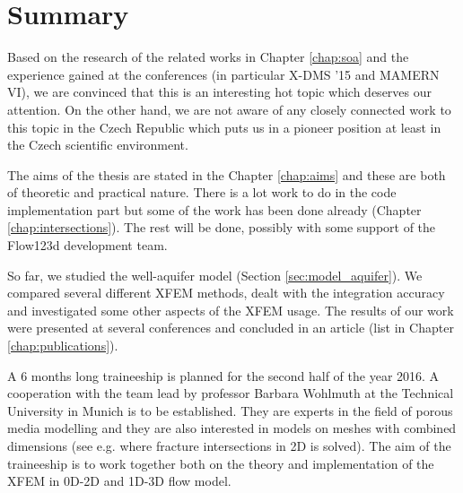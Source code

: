 \documentclass[bibliography=totocnumbered,dvipsnames,FM,Dis]{tulthesis}
\begin{document}

\chapter{Summary} \label{chap:summary}

Based on the research of the related works in Chapter \ref{chap:soa} and the experience gained at the conferences
(in particular X-DMS '15 and MAMERN VI), we are convinced that this is an interesting hot topic which deserves
our attention. On the other hand, we are not aware of any closely connected work to this topic in the Czech Republic
which puts us in a pioneer position at least in the Czech scientific environment.

The aims of the thesis are stated in the Chapter \ref{chap:aims} and these are both of theoretic and practical nature.
There is a lot work to do in the code implementation part but some of the work has been done already 
(Chapter \ref{chap:intersections}). The rest will be done, possibly with some support of the Flow123d development team. 

So far, we studied the well-aquifer model (Section \ref{sec:model_aquifer}). We compared several different XFEM methods, 
dealt with the integration accuracy and investigated some other aspects of the XFEM usage. The results
of our work were presented at several conferences and concluded in an article (list in Chapter \ref{chap:publications}).

A 6 months long traineeship is planned for the second half of the year 2016. A cooperation with the team lead
by professor Barbara Wohlmuth at the Technical University in Munich is to be established. They are experts
in the field of porous media modelling and they are also interested in models on meshes with combined dimensions
(see e.g. \cite{schwenck_2015} where fracture intersections in 2D is solved). The aim of the traineeship is to
work together both on the theory and implementation of the XFEM in 0D-2D and 1D-3D flow model.



{\small

% 

}
\end{document}
